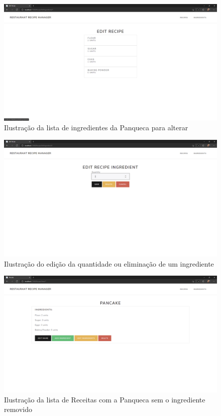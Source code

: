 \FloatBarrier
\begin{figure}[!hbt]
    \centering
    \includegraphics[width=14cm]{Resources/WebApp/Recipes/recipe (7).png}
    \caption{Ilustração da lista de ingredientes da Panqueca para alterar}
    \label{fig:app_rec_7}
\end{figure}
\FloatBarrier
\begin{figure}[!hbt]
    \centering
    \includegraphics[width=14cm]{Resources/WebApp/Recipes/recipe (8).png}
    \caption{Ilustração do edição da quantidade ou eliminação de um ingrediente}
    \label{fig:app_rec_8}
\end{figure}
\FloatBarrier
\begin{figure}[!hbt]
    \centering
    \includegraphics[width=14cm]{Resources/WebApp/Recipes/recipe (9).png}
    \caption{Ilustração da lista de Receitas com a Panqueca sem o ingrediente removido}
    \label{fig:app_rec_9}
\end{figure}
